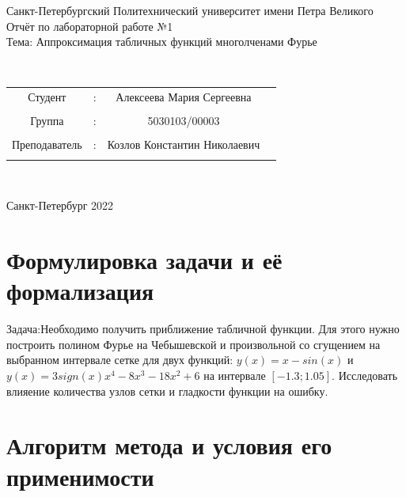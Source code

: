 \documentclass[a4paper]{article}
\begin{document}
\begin{center} 
\hfill \break 
\large{Санкт-Петербургский Политехнический университет имени Петра Великого}\\ 
 
 \hfill \break 
\hfill\break 
\hfill \break 
\hfill \break 
\hfill \break 
\large{Отчёт по лабораторной работе №1}\\ 
\hfill \break 
\large{Тема: Аппроксимация табличных функций многолченами Фурье } 
\hfill \break 
\hfill \break 
 
\hfill \break 
\hfill \break 
\\ 
\hfill \break 
\hfill \break 
\end{center} 


\normalsize{ 
\begin{tabular}{cccc} 
Студент & : & Алексеева Мария Сергеевна\\\\ 
Группа & : & 5030103/00003 \\\\ 
Преподаватель & : & Козлов Константин Николаевич \\\\ 
\end{tabular} 
}\\ 
\hfill \break 
\hfill \break 
\hfill \break 
\begin{center} Санкт-Петербург 2022 \end{center} 
\thispagestyle{empty} %
 
\newpage 
	
\section{Формулировка задачи и её формализация} 
Задача:Необходимо получить приближение табличной функции. Для этого нужно построить полином Фурье на Чебышевской и произвольной со сгущением на выбранном интервале сетке для двух функций: $ y(x) = x - sin(x)$ и $ y(x) = 3sign(x)x^{4}-8x^{3}-18x^{2}+6$ на интервале $[-1.3;1.05]$.  Исследовать влияение количества узлов сетки и гладкости функции на ошибку.
\section{Алгоритм метода и условия его применимости} 
\end{document}
